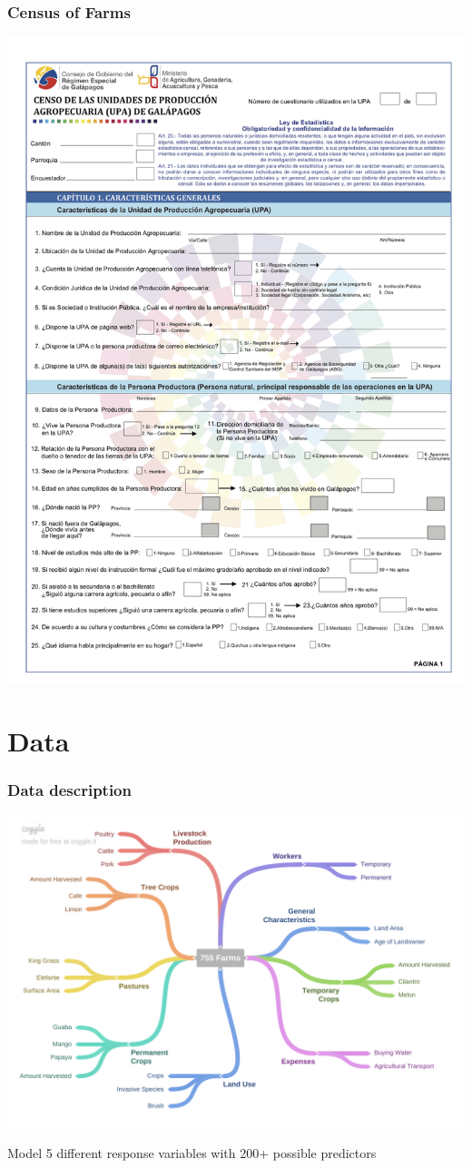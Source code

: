 \documentclass{beamer}
\begin{document}
\begin{frame}
\frametitle{Census of Farms}
\centering
\includegraphics[scale=0.5]{survey}



\end{frame}


\section{Data}

\begin{frame}
\frametitle{Data description}
\centering
\includegraphics[scale=0.4]{755_farms}

Model 5 different response variables with 200+ possible predictors
\end{frame}
\end{document}
